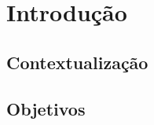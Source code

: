 \documentclass[
	12pt,				%
	openright,			%
	oneside,
	a4paper,				%
	english,				%
	brazil				%
]{abntex2/abntex2} %
\begin{document}











\tableofcontents*
\cleardoublepage



\textual

\chapter{Introdução}

	\section{Contextualização}

	\section{Objetivos}
\end{document}
